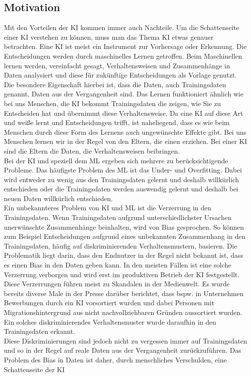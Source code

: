 \begin{onehalfspace}
    \newpage
    \section{Motivation}
    \label{subsec:motivation}
        Mit den Vorteilen der \ac*{KI} kommen immer auch Nachteile. Um die Schattenseite einer \ac*{KI} verstehen zu können, muss man das Thema \ac*{KI} etwas genauer betrachten. Eine \ac*{KI} ist meist ein Instrument zur Vorhersage oder Erkennung. Die Entscheidungen werden durch maschinelles Lernen getroffen. Beim Maschinellen lernen werden, vereinfacht gesagt, Verhaltensweisen und Zusammenhänge in Daten analysiert und diese für zukünftige Entscheidungen als Vorlage genutzt. Die besondere Eigenschaft hierbei ist, dass die Daten, auch Trainingsdaten genannt, Daten aus der Vergangenheit sind. Das Lernen funktioniert ähnlich wie bei uns Menschen, die \ac*{KI} bekommt Trainingsdaten die zeigen, wie Sie zu Entscheiden hat und übernimmt diese Verhaltensweise. Da eine \ac*{KI} auf diese Art und weiße lernt und Entscheidungen trifft, ist naheliegend, dass es wie beim Menschen durch diese Form des Lernens auch ungewünschte Effekte gibt. Bei uns Menschen lernen wir in der Regel von den Eltern, die einen erziehen. Bei einer \ac*{KI} sind die Eltern die Daten, die Verhaltensweisen beibringen. 
        \\
        Bei der \ac*{KI} und speziell dem \ac{ML} ergeben sich mehrere zu berücksichtigende Probleme. Das häufigste Problem des \ac*{ML} ist das Under- und Overfitting. Dabei wird entweder zu wenig aus den Trainingsdaten gelernt und deshalb willkürlich entschieden oder die Trainingsdaten werden \glqq{}auswendig\grqq{} gelernt und deshalb bei neuen Daten willkürlich entschieden. 
        \\
        Ein unbekannteres Problem von \ac*{KI} und \ac*{ML} ist die Verzerrung in den Trainingsdaten. Wenn Trainingsdaten aufgrund unterschiedlichster Ursachen unerwünschte Zusammenhänge beinhalten, wird von Bias gesprochen. So können zum Beispiel Entscheidungen aufgrund eines unbekannten Zusammenhang in den Trainingsdaten, häufig auf diskriminierenden Verhaltensmustern, basieren. Die Problematik liegt darin, dass den Endnutzer in der Regel nicht bekannt ist, dass es einen Bias in den Daten geben kann. In den meisten Fällen ist eine solche Verzerrung verborgen und wird erst im produktiven Betrieb der \ac*{KI} festgestellt.
        \\
        Diese Verzerrungen führen meist zu Skandalen in der Medienwelt. Es wurde bereits diverse Male in der Presse darüber berichtet, dass bspw. in Unternehmen Bewerbungen durch ein \ac*{KI} vorsortiert wurden und dabei Personen mit Migrationshintergrund aus nicht nachvollziehbaren Gründen aussortiert wurden. Ein solches diskriminierendes Verhaltensmuster wurde daraufhin in den Trainingsdaten erkannt.
        \\
        Diese Diskriminierungen sind jedoch nicht zu vergessen immer auf Trainingsdaten und so in der Regel auf reale Daten aus der Vergangenheit zurückzuführen. Das Problem des Bias in Daten ist daher, durch menschliches Verschulden, eine Schattenseite der \ac*{KI} 


\end{onehalfspace}
